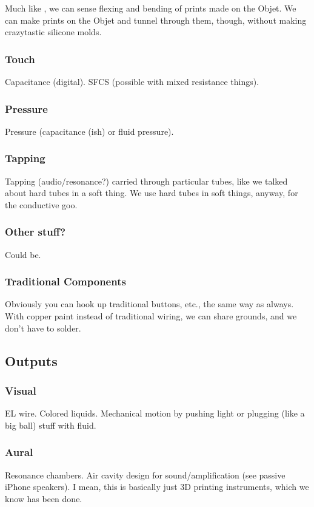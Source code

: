 Much like \cite{Slyper-shape}, we can sense flexing and bending of prints made on the Objet.  We can make prints on the Objet and tunnel through them, though, without making crazytastic silicone molds.

\subsubsection{Touch}
Capacitance (digital).  SFCS (possible with mixed resistance things).

\subsubsection{Pressure}
Pressure (capacitance (ish) or fluid pressure). 

\subsubsection{Tapping}
 Tapping (audio/resonance?) carried through particular tubes, like we talked about hard tubes in a soft thing.  We use hard tubes in soft things, anyway, for the conductive goo.

\subsubsection{Other stuff?}
Could be.

\subsubsection{Traditional Components}
Obviously you can hook up traditional buttons, etc., the same way as always.  With copper paint instead of traditional wiring, we can share grounds, and we don't have to solder.

\subsection{Outputs}

\subsubsection{Visual}
EL wire.  Colored liquids.  Mechanical motion by pushing light or plugging (like a big ball) stuff with fluid.

\subsubsection{Aural}
Resonance chambers.  Air cavity design for sound/amplification (see passive iPhone speakers).  I mean, this is basically just 3D printing instruments, which we know has been done.

